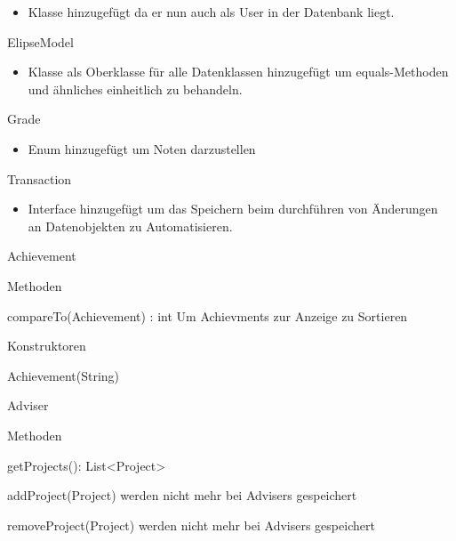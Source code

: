 \documentclass[parskip=full]{scrartcl}
\newcommand{\changeDescription}[1]{{\newline\color{black}\normalfont #1}}
\newcommand{\code}[1]{{\ttfamily #1}}
\begin{document}
\begin{itemPackage}
\begin{itemClass}
\begin{itemize}
  \item Klasse hinzugefügt da er nun auch als \code{User} in der Datenbank
  liegt.
\end{itemize}
\item ElipseModel
\begin{itemize}
  \item Klasse als Oberklasse für alle Datenklassen hinzugefügt um
  \code{equals}-Methoden und ähnliches einheitlich zu behandeln.
\end{itemize}
\item Grade
\begin{itemize}
  \item Enum hinzugefügt um Noten darzustellen
\end{itemize}
\item Transaction
\begin{itemize}
  \item Interface hinzugefügt um das Speichern beim durchführen von Änderungen
  an Datenobjekten zu Automatisieren.
\end{itemize}
\item Achievement
\begin{itemClassSub}
\item Methoden
\begin{itemPlus}
\item compareTo(Achievement) : int \changeDescription{Um \code{Achievments} zur
Anzeige zu Sortieren }
\end{itemPlus}
\item Konstruktoren
\begin{itemPlus}
\item Achievement(String)
\end{itemPlus}
\end{itemClassSub}
\item Adviser
\item \begin{itemClassSub}
\item Methoden
\begin{itemPlus}
\item getProjects(): List<Project>
\end{itemPlus}
\begin{itemMinus}
\item addProject(Project) \changeDescription{\code{Projects} werden nicht mehr
bei \code{Advisers} gespeichert}
\item removeProject(Project)\changeDescription{\code{Projects} werden nicht mehr
bei \code{Advisers} gespeichert}
\end{itemMinus}

\end{itemClassSub}
\end{itemClass}
\end{itemPackage}
\end{document}
